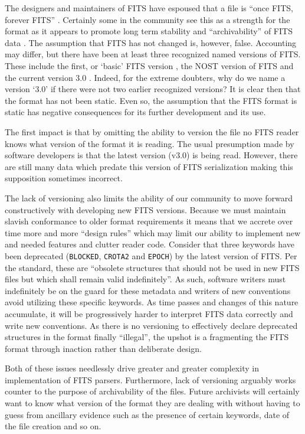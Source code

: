 \documentclass[final,authoryear,5p,times,twocolumn]{elsarticle}
\begin{document}
{{The designers and maintainers of FITS have espoused that a file is
``once FITS, forever FITS'' \citep[see e.g.,][]{1988A&AS...73..359G,1993FITS1}.
Certainly some in the community see this as a strength for the format
as it appears to promote long term stability and ``archivability'' of FITS
data \citep{2012EWASSAlle,2012LOC}. The assumption that FITS has not changed
is, however, false. Accounting may differ, but there have been at least three
recognized named versions of FITS. These include the first, or `basic' FITS
version \citep{1979ipia.coll..445W}, the NOST version of FITS
\citep{2001A&A...376..359H} and the current version 3.0 \citep{2010A&A...524A..42P}.
Indeed, for the extreme doubters, why do we name a version `3.0' if there
were not two earlier recognized versions? It is clear then that the format
has not been static.  Even so, the assumption that the FITS format is static
has negative consequences for its further development and its use.


The first impact is that by omitting the ability to version the file no
FITS reader knows what version of the format it is reading. The usual
presumption made by software developers is that the latest version (v3.0)
is being read. However, there are still many data which predate
this version of FITS serialization making this supposition sometimes
incorrect.


The lack of versioning also limits the ability of our community to
move forward constructively with developing new FITS versions. 
Because we must maintain slavish conformance to older format requirements 
it means that we accrete over time more and more ``design rules'' 
which may limit our ability to implement new and needed features and 
clutter reader code. Consider that three keywords have been deprecated 
(\texttt{BLOCKED}, \texttt{CROTA2} and \texttt{EPOCH}) by the latest version 
of FITS. Per the standard, these are ``obsolete structures that should not be 
used in new FITS files but which shall remain valid indefinitely''.
As such, software writers must indefinitely be on the guard for these metadata
and writers of new conventions avoid utilizing these specific keywords.
As time passes and changes of this nature accumulate, it will be progressively
harder to interpret FITS data correctly and write new conventions.
As there is no versioning to effectively declare deprecated structures in the 
format finally ``illegal'', the upshot is a fragmenting the FITS format through
inaction rather than deliberate design.


Both of these issues needlessly drive greater and greater complexity
in implementation of FITS parsers. Furthermore, lack of versioning
arguably works counter to the purpose of archivability of the files. 
Future archivists will certainly want to know what version of the
format they are dealing with without having to guess from ancillary
evidence such as the presence of certain keywords, date of the file
creation and so on.


}}
\end{document}
